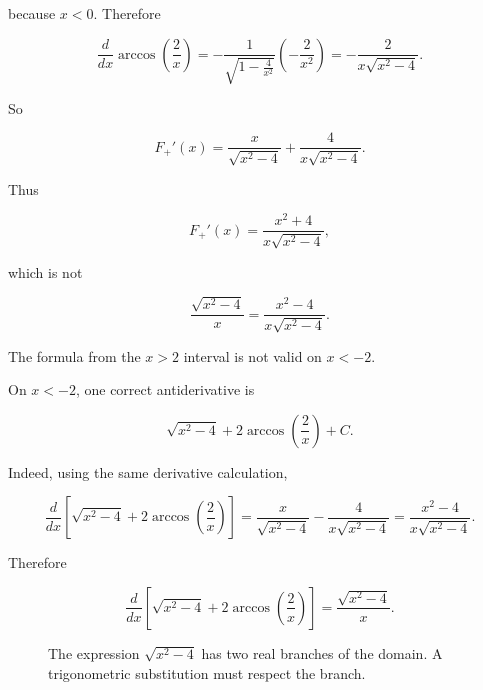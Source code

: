 because \(x<0\).  Therefore

\[
\frac{d}{dx}\arccos\left(\frac2x\right)
=
-\frac{1}{\sqrt{1-\frac4{x^2}}}\left(-\frac2{x^2}\right)
=
-\frac{2}{x\sqrt{x^2-4}}.
\]

So

\[
F_+'(x)
=
\frac{x}{\sqrt{x^2-4}}
+
\frac{4}{x\sqrt{x^2-4}}.
\]

Thus

\[
F_+'(x)
=
\frac{x^2+4}{x\sqrt{x^2-4}},
\]

which is not

\[
\frac{\sqrt{x^2-4}}{x}
=
\frac{x^2-4}{x\sqrt{x^2-4}}.
\]

The formula from the \(x>2\) interval is not valid on \(x<-2\).

On \(x<-2\), one correct antiderivative is

\[
\boxed{
\sqrt{x^2-4}
+
2\arccos\left(\frac2x\right)
+C.
}
\]

Indeed, using the same derivative calculation,

\[
\frac{d}{dx}
\left[
\sqrt{x^2-4}
+
2\arccos\left(\frac2x\right)
\right]
=
\frac{x}{\sqrt{x^2-4}}
-
\frac{4}{x\sqrt{x^2-4}}
=
\frac{x^2-4}{x\sqrt{x^2-4}}.
\]

Therefore

\[
\frac{d}{dx}
\left[
\sqrt{x^2-4}
+
2\arccos\left(\frac2x\right)
\right]
=
\frac{\sqrt{x^2-4}}{x}.
\]

\begin{figure}[h]
\centering
{}
\caption{The expression \(\sqrt{x^2-4}\) has two real branches of the domain.  A trigonometric substitution must respect the branch.}
\label{fig:trig-substitution-domain-branches}
\end{figure}


